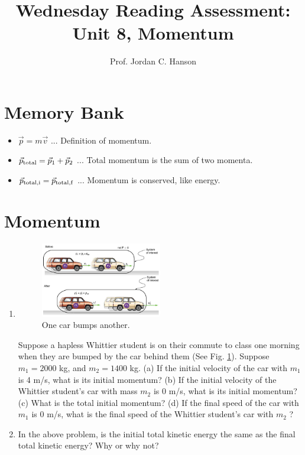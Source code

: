 \documentclass{article}
\begin{document}
\title{Wednesday Reading Assessment: Unit 8, Momentum}
\author{Prof. Jordan C. Hanson}

\maketitle

\section{Memory Bank}

\begin{itemize}
\item $\vec{p} = m\vec{v}$ ... Definition of momentum.
\item $\vec{p}_{\rm total} = \vec{p}_1 + \vec{p}_2$ ... Total momentum is the sum of two momenta.
\item $\vec{p}_{\rm total,i} = \vec{p}_{\rm total,f}$ ... Momentum is conserved, like energy.
\end{itemize}

\section{Momentum}

\begin{enumerate}
\item
\begin{figure}[ht]
\centering
\includegraphics[width=0.5\textwidth]{cars.png}
\caption{\label{fig:cars} One car bumps another.}
\end{figure}
Suppose a hapless Whittier student is on their commute to class one morning when they are bumped by the car behind them (See Fig. \ref{fig:cars}).  Suppose $m_1 = 2000$ kg, and $m_2 = 1400$ kg.  (a) If the initial velocity of the car with $m_1$ is 4 m/s, what is its initial momentum? (b) If the initial velocity of the Whittier student's car with mass $m_2$ is 0 m/s, what is its initial momentum? (c) What is the total initial momentum? (d) If the final speed of the car with $m_1$ is 0 m/s, what is the final speed of the Whittier student's car with $m_2$ ? \\ \vspace{2cm}
\item In the above problem, is the initial total kinetic energy the same as the final total kinetic energy?  Why or why not?
\end{enumerate}
\end{document}
